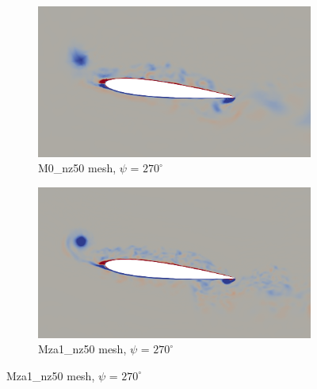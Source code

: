 \begin{figure}[H]
	\centering
	\begin{center}
		\begin{subfigure}[b]{0.6\textwidth}
			\centering
			\includegraphics[width=1\textwidth]{figures/zonal_adapt_results/vorticity_plots_Re200k/M0/phase_270.png}
			\caption{M0\_nz50 mesh, $\psi$ = $270^\circ$}
			\label{fig:M0_Re200k_sp_psi270}
		\end{subfigure}
	\end{center}
	\begin{subfigure}[b]{0.6\textwidth}
		\centering
		\includegraphics[width=1\textwidth]{figures/zonal_adapt_results/vorticity_plots_Re200k/Mza1_50/phase_270.png}
		\caption{Mza1\_nz50 mesh, $\psi$ = $270^\circ$}
		\label{fig:Mza1_50_Re200k_sp_psi270}
	\end{subfigure}

\end{figure}
